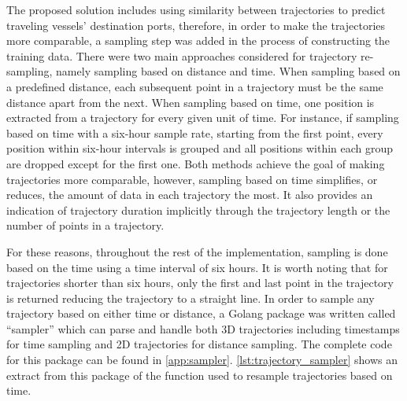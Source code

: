 The proposed solution includes using similarity between trajectories to predict traveling vessels' destination ports, therefore, in order to make the trajectories more comparable, a sampling step was added in the process of constructing the training data. There were two main approaches considered for trajectory re-sampling, namely sampling based on distance and time. When sampling based on a predefined distance, each subsequent point in a trajectory must be the same distance apart from the next. When sampling based on time, one position is extracted from a trajectory for every given unit of time. For instance, if sampling based on time with a six-hour sample rate, starting from the first point, every position within six-hour intervals is grouped and all positions within each group are dropped except for the first one. Both methods achieve the goal of making trajectories more comparable, however, sampling based on time simplifies, or reduces, the amount of data in each trajectory the most. It also provides an indication of trajectory duration implicitly through the trajectory length or the number of points in a trajectory.

For these reasons, throughout the rest of the implementation, sampling is done based on the time using a time interval of six hours. It is worth noting that for trajectories shorter than six hours, only the first and last point in the trajectory is returned reducing the trajectory to a straight line. In order to sample any trajectory based on either time or distance, a Golang package was written called ``sampler'' which can parse and handle both 3D trajectories including timestamps for time sampling and 2D trajectories for distance sampling. The complete code for this package can be found in \cref{app:sampler}. \cref{lst:trajectory_sampler} shows an extract from this package of the function used to resample trajectories based on time.

